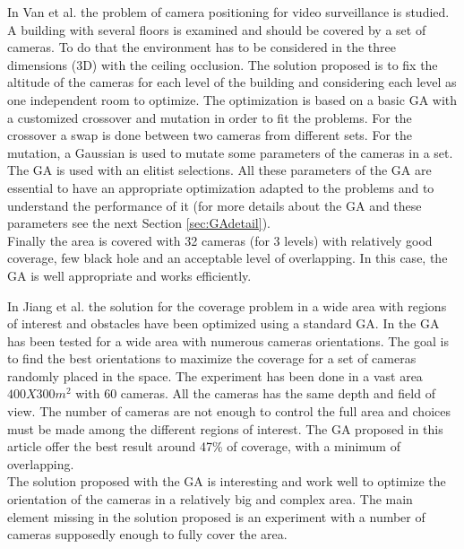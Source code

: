 In Van et al. \cite{83*van2009} the problem of camera positioning for video surveillance is studied. A building with several floors is examined and should be covered by a set of cameras. To do that the environment has to be considered in the three dimensions (3D) with the ceiling occlusion. The solution proposed is to fix the altitude of the cameras for each level of the building and considering each level as one independent room to  optimize. 
The optimization is based on a basic GA with a customized crossover and mutation in order to fit the problems. 
For the crossover a swap is done between two cameras from different sets. %
 For the mutation, a Gaussian is used to mutate some parameters of the cameras in a set. The GA is used with an elitist selections. All these parameters of the GA are essential to have an appropriate optimization adapted  to the problems and to understand the performance of it (for more details about the GA and these parameters see the next Section \ref{sec:GAdetail}).  \\ 
Finally the area is covered with 32 cameras (for 3 levels) with relatively good coverage, few black hole and an acceptable level of overlapping. In this case, the GA is well appropriate and works efficiently.

In Jiang et al. \cite{165*jiang2010} the solution for the coverage problem in a wide area with regions of interest and obstacles have been optimized using a standard GA. In \cite{165*jiang2010} the GA has been tested for a wide area with numerous cameras orientations. The goal is to find the best orientations to maximize the coverage for a set of cameras  randomly placed in the space. The experiment has been done in a vast area $400X300m^2$ with 60 cameras.
 All the cameras has the same depth and field of view. The number of cameras are not enough to control the full area and  choices must be made among the different regions of interest. The GA proposed in this article offer the best result around 47\% of coverage, with a minimum of overlapping. \\
The solution proposed with the GA is interesting and work well to optimize the orientation of the cameras in  a relatively big and complex area. The main element missing in the solution proposed is an experiment with a number of cameras supposedly enough to fully cover the area. 

